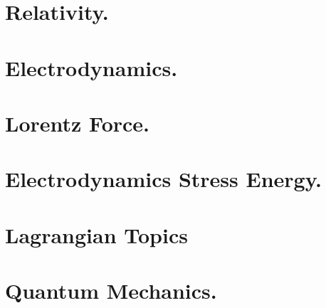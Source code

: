 \documentclass[12pt,leqno]{book}
\begin{document}
\part{Relativity.}






\part{Electrodynamics.}















\part{Lorentz Force.}




\part{Electrodynamics Stress Energy.}








\part{Lagrangian Topics}
\part{Quantum Mechanics.}





\end{document}

